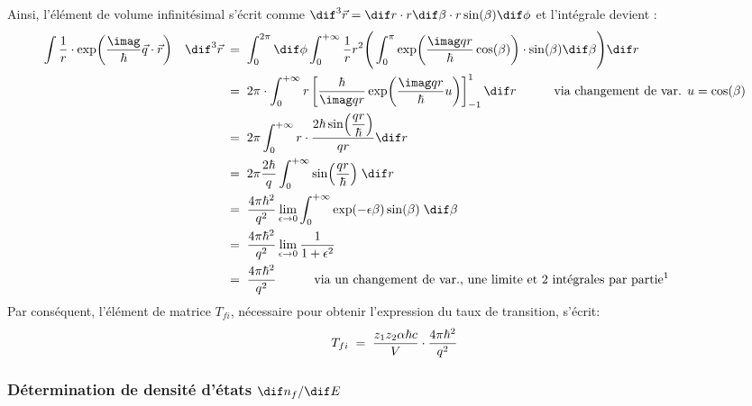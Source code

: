 Ainsi, l'élément de volume infinitésimal s'écrit comme  $\dif^3\vec{r} = \dif r \cdot r \dif\beta \cdot r \sin(\beta) \dif\phi $ et l'intégrale devient :
\begin{align*}
    \int \dfrac{1}{r} \cdot \exp(\dfrac{\imag}{\hbar}\vec{q}\cdot\vec{r})
    \quad \dif^3\vec{r}
        &\eq
    \int_{0}^{2 \pi} \dif\phi
    \int_{0}^{+\infty} \dfrac{1}{r}r^2 
    \Bigg( 
        \int_{0}^{\pi}
        \exp(\dfrac{\imag qr}{\hbar}\cos(\beta)) \cdot \sin(\beta) \dif\beta
    \Bigg) \dif r\\
        &\eq
    2 \pi \cdot \int_{0}^{+\infty} r 
    \left[
      \dfrac{\hbar}{\imag qr}\exp(\dfrac{\imag qr}{\hbar}u)
    \right]^{1}_{-1}
    \dif r 
    \qquad \quad \text{via changement de var. } u = \cos(\beta)\\
        &\eq
    2 \pi \int_{0}^{+\infty} r
    \cdot \dfrac{2\hbar \sin(\dfrac{qr}{\hbar})}{qr} \dif r\\
        &\eq
    2 \pi \dfrac{2\hbar}{q} \int_{0}^{+\infty} \sin(\dfrac{qr}{\hbar}) \; \dif r\\
        &\eq
    \dfrac{4\pi\hbar^2}{q^2} \lim_{\epsilon \rightarrow 0}\int_{0}^{+\infty}\exp(-\epsilon \beta) \sin(\beta) \; \dif\beta\\
        &\eq
    \dfrac{4\pi\hbar^2}{q^2} \lim_{\epsilon \rightarrow 0}\dfrac{1}{1 + \epsilon^2}\\
        &\eq
    \dfrac{4\pi\hbar^2}{q^2}
    \qquad \quad \text{via un changement de var., une limite et 2 intégrales par partie\footnotemark} 
\end{align*}
Par conséquent, l'élément de matrice $T_{fi}$, nécessaire pour obtenir l'expression du taux de transition, s'écrit:
\[
    T_{fi} 
    \; = \; 
    \dfrac{z_1 z_2\alpha\hbar c}{V} \cdot \dfrac{4 \pi \hbar^2}{q^2}
\]



\subsubsection{Détermination de densité d'états $\dif n_f/\dif E$}


